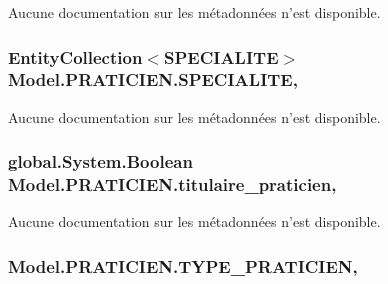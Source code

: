 Aucune documentation sur les métadonnées n'est disponible. 

\hypertarget{class_model_1_1_p_r_a_t_i_c_i_e_n_a15a32a4f8d3a3abc5d4644d2c9b5d29e}{
\subsubsection[{S\-P\-E\-C\-I\-A\-L\-I\-T\-E}]{\setlength{\rightskip}{0pt plus 5cm}Entity\-Collection$<${\bf S\-P\-E\-C\-I\-A\-L\-I\-T\-E}$>$ Model.\-P\-R\-A\-T\-I\-C\-I\-E\-N.\-S\-P\-E\-C\-I\-A\-L\-I\-T\-E\hspace{0.3cm}{\ttfamily [get]}, {\ttfamily [set]}}}\label{class_model_1_1_p_r_a_t_i_c_i_e_n_a15a32a4f8d3a3abc5d4644d2c9b5d29e}


Aucune documentation sur les métadonnées n'est disponible. 

\hypertarget{class_model_1_1_p_r_a_t_i_c_i_e_n_aab525a0862d5b0b441b850563c7f2a69}{
\subsubsection[{titulaire\-\_\-praticien}]{\setlength{\rightskip}{0pt plus 5cm}global.\-System.\-Boolean Model.\-P\-R\-A\-T\-I\-C\-I\-E\-N.\-titulaire\-\_\-praticien\hspace{0.3cm}{\ttfamily [get]}, {\ttfamily [set]}}}\label{class_model_1_1_p_r_a_t_i_c_i_e_n_aab525a0862d5b0b441b850563c7f2a69}


Aucune documentation sur les métadonnées n'est disponible. 

\hypertarget{class_model_1_1_p_r_a_t_i_c_i_e_n_ab44028a89527b640b54ed235f767ecb0}{
\subsubsection[{T\-Y\-P\-E\-\_\-\-P\-R\-A\-T\-I\-C\-I\-E\-N}]{ Model.\-P\-R\-A\-T\-I\-C\-I\-E\-N.\-T\-Y\-P\-E\-\_\-\-P\-R\-A\-T\-I\-C\-I\-E\-N\hspace{0.3cm}{\ttfamily [get]}, {\ttfamily [set]}}}\label{class_model_1_1_p_r_a_t_i_c_i_e_n_ab44028a89527b640b54ed235f767ecb0}


